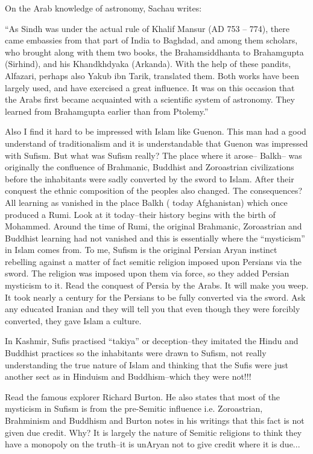 \begin{footnotesize}
\begin{sffamily}
On the Arab knowledge of astronomy, Sachau writes:

``As Sindh was under the actual rule of Khalif Mansur (AD 753 -- 774), there came embassies from that part of India to Baghdad, and among them scholars, who brought along with them two books, the Brahamsiddhanta to Brahamgupta (Sirhind), and his Khandkhdyaka (Arkanda). With the help of these pandits, Alfazari, perhaps also Yakub ibn Tarik, translated them. Both works have been largely used, and have exercised a great influence. It was on this occasion that the Arabs first became acquainted with a scientific system of astronomy. They learned from Brahamgupta earlier than from Ptolemy.''

Also I find it hard to be impressed with Islam like Guenon. This man had a good understand of traditionalism and it is understandable that Guenon was impressed with Sufism. But what was Sufism really? The place where it arose-- Balkh-- was originally the confluence of Brahmanic, Buddhist and Zoroastrian civilizations before the inhabitants were sadly converted by the sword to Islam. After their conquest the ethnic composition of the peoples also changed. The consequences? All learning as vanished in the place Balkh ( today Afghanistan) which once produced a Rumi. Look at it today--their history begins with the birth of Mohammed. Around the time of Rumi, the original Brahmanic, Zoroastrian and Buddhist learning had not vanished and this is essentially where the ``mysticism'' in Islam comes from. To me, Sufism is the original Persian Aryan instinct rebelling against a matter of fact semitic religion imposed upon Persians via the sword. The religion was imposed upon them via force, so they added Persian mysticism to it. Read the conquest of Persia by the Arabs. It will make you weep. It took nearly a century for the Persians to be fully converted via the sword. Ask any educated Iranian and they will tell you that even though they were forcibly converted, they gave Islam a culture.

In Kashmir, Sufis practised ``takiya'' or deception--they imitated the Hindu and Buddhist practices so the inhabitants were drawn to Sufism, not really understanding the true nature of Islam and thinking that the Sufis were just another sect as in Hinduism and Buddhism--which they were not!!!

Read the famous explorer Richard Burton. He also states that most of the mysticism in Sufism is from the pre-Semitic influence i.e. Zoroastrian, Brahminism and Buddhism and Burton notes in his writings that this fact is not given due credit. Why? It is largely the nature of Semitic religions to think they have a monopoly on the truth--it is unAryan not to give credit where it is due... 


\end{sffamily}
\end{footnotesize}
